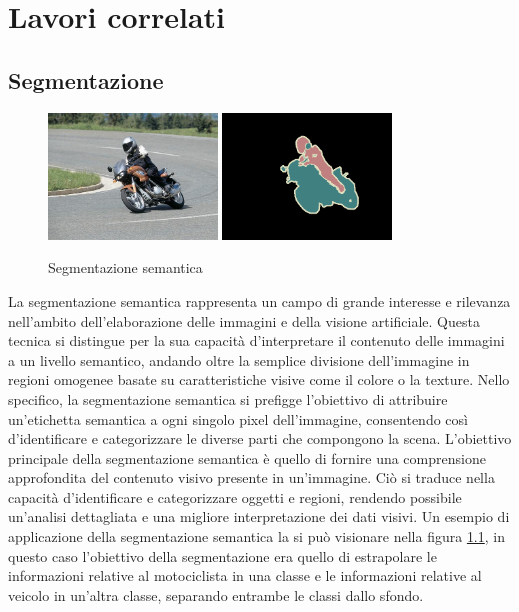
\chapter{Lavori correlati} \label{chap:related_works}
\section{Segmentazione} \label{sec:segmentazione} 

\begin{figure}[H]
  \begin{center}
    \includegraphics[width=0.4\textwidth]{Immagini/segmantion_example_image.png}
    \includegraphics[width=0.4\textwidth]{Immagini/segmantion_example_mask.png}
  \end{center}
  \caption{Segmentazione semantica}
  \label{fig:segmentazione}
\end{figure}

La segmentazione semantica rappresenta un campo di grande interesse e rilevanza
nell'ambito dell'elaborazione delle immagini e della visione artificiale. Questa
tecnica si distingue per la sua capacità d'interpretare il contenuto delle
immagini a un livello semantico, andando oltre la semplice divisione
dell'immagine in regioni omogenee basate su caratteristiche visive come il
colore o la texture. Nello specifico, la segmentazione semantica si prefigge
l'obiettivo di attribuire un'etichetta semantica a ogni singolo pixel
dell'immagine, consentendo così d'identificare e categorizzare le diverse parti
che compongono la scena.  L'obiettivo principale della segmentazione semantica è
quello di fornire una comprensione approfondita del contenuto visivo presente in
un'immagine. Ciò si traduce nella capacità d'identificare e categorizzare
oggetti e regioni, rendendo possibile un'analisi dettagliata e una migliore
interpretazione dei dati visivi.
Un esempio di applicazione della segmentazione semantica la si pu\`o visionare
nella figura \ref{fig:segmentazione}, in questo caso l'obiettivo della segmentazione era quello di 
estrapolare le informazioni relative al motociclista in una classe e le informazioni relative 
al veicolo in un'altra classe, separando entrambe le classi dallo sfondo.



